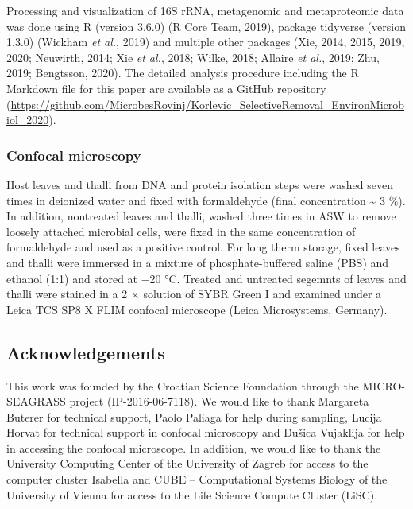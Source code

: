 \documentclass[12pt,]{article}
\begin{document}
Processing and visualization of 16S rRNA, metagenomic and metaproteomic
data was done using R (version 3.6.0) (R Core Team, 2019), package
tidyverse (version 1.3.0) (Wickham \emph{et al.}, 2019) and multiple
other packages (Xie, 2014, 2015, 2019, 2020; Neuwirth, 2014; Xie
\emph{et al.}, 2018; Wilke, 2018; Allaire \emph{et al.}, 2019; Zhu,
2019; Bengtsson, 2020). The detailed analysis procedure including the R
Markdown file for this paper are available as a GitHub repository
(\url{https://github.com/MicrobesRovinj/Korlevic_SelectiveRemoval_EnvironMicrobiol_2020}).

\hypertarget{confocal-microscopy}{%
\subsubsection{Confocal microscopy}\label{confocal-microscopy}}

Host leaves and thalli from DNA and protein isolation steps were washed
seven times in deionized water and fixed with formaldehyde (final
concentration \textasciitilde{} 3 \si{\percent}). In addition,
nontreated leaves and thalli, washed three times in ASW to remove
loosely attached microbial cells, were fixed in the same concentration
of formaldehyde and used as a positive control. For long therm storage,
fixed leaves and thalli were immersed in a mixture of phosphate-buffered
saline (PBS) and ethanol (1:1) and stored at \num{-20}
\si{\degreeCelsius}. Treated and untreated segemnts of leaves and thalli
were stained in a 2 × solution of SYBR Green I and examined under a
Leica TCS SP8 X FLIM confocal microscope (Leica Microsystems, Germany).

\hypertarget{acknowledgements}{%
\subsection{Acknowledgements}\label{acknowledgements}}

This work was founded by the Croatian Science Foundation through the
MICRO-SEAGRASS project (IP-2016-06-7118). We would like to thank
Margareta Buterer for technical support, Paolo Paliaga for help during
sampling, Lucija Horvat for technical support in confocal microscopy and
Dušica Vujaklija for help in accessing the confocal microscope. In
addition, we would like to thank the University Computing Center of the
University of Zagreb for access to the computer cluster Isabella and
CUBE -- Computational Systems Biology of the University of Vienna for
access to the Life Science Compute Cluster (LiSC).
\end{document}
